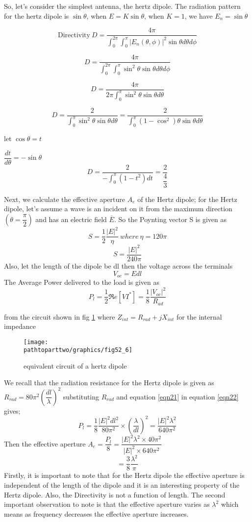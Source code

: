So, let's consider the simplest antenna, the hertz dipole. The radiation pattern for the hertz dipole is $\sin\theta$, when $E=K\sin\theta$, when $K=1$, we have $E_{n}=\sin\theta$

$$\text{Directivity} \ D=\dfrac{4\pi}{\int_{0}^{2\pi}\int_{0}^{\pi}|E_n(\theta , \phi)|^{2} \sin\theta d\theta d\phi}$$

$$ D=\dfrac{4\pi}{\int_{0}^{2\pi}\int_{0}^{\pi}\sin^{2}\theta \sin\theta d\theta d\phi}$$

$$ D=\dfrac{4\pi}{2\pi\int_{0}^{\pi}\sin^{2}\theta \sin\theta d\theta}$$

$$ D=\dfrac{2}{\int_{0}^{\pi}\sin^{2}\theta \sin\theta d\theta} = \dfrac{2}{\int_{0}^{\pi}(1-\cos^{2})\theta \sin\theta d\theta} $$

let $\cos\theta = t$

$\dfrac{dt}{d\theta}=-\sin\theta$
$$ D=\dfrac{2}{-\int_{0}^{\pi}(1-t^{2})dt} = \dfrac{2}{\dfrac{4}{3}} $$

Next, we calculate the effective aperture $A_{e}$ of the Hertz dipole; for the Hertz dipole, let's assume a wave is an incident on it from the maximum direction $(\theta=\dfrac{\pi}{2})$ and has an electric field $\bar{E}$. So the Poynting vector S is given as 
$$ S= \dfrac{1}{2}\dfrac{|E|^{{2}}}{\eta} \ where \  \eta =120\pi$$
$$ S= \dfrac{|E|^{{2}}}{240\pi}$$
Also, let the length of the dipole be dl then the voltage across the terminals
\begin{equation}
V_{oc}=Edl
\label{eqn21}
\end{equation}
The Average Power delivered to the load is given as
\begin{equation}
P_{l}=\dfrac{1}{2}\Re e [VI^{*}]=\dfrac{1}{8}\dfrac{|V_{oc}|^{2}}{R_{ad}}
\label{eqn22}
\end{equation}

from the circuit shown in fig \ref{fig6} where $Z_{int}=R_{rad}+jX_{int} $ for the internal impedance 
\begin{figure}[h]
\centering
\texttt{[image: \\pathtoparttwo/graphics/fig52\_6]}
\caption{equivalent circuit of a hertz dipole}
\label{fig6}	
\end{figure}

We recall that the radiation resistance for the Hertz dipole is given as $R_{rad}=80\pi^{2}(\dfrac{dl}{\lambda})^{2}$ substituting $R_{rad}$ and equation \ref{eqn21} in equation \ref{eqn22} gives; 
$$	P_{l}=\dfrac{1}{8}\dfrac{|E|^{2}dl^{2}}{80\pi^{2}}\times\left(\dfrac{\lambda}{dl}\right)^{2}= \dfrac{|E|^{2}\lambda^{2}}{640\pi^{2}}$$
Then the effective aperture $A_{e}=\dfrac{P_{l}}{8}=\dfrac{|E|^{2}\lambda^{2}\times40\pi^{2}}{|E|^{2}\times640\pi^{2}}$
$$=\dfrac{3}{8}\dfrac{\lambda^{2}}{\pi}$$
Firstly, it is important to note that for the Hertz dipole the effective aperture is independent of the length of the dipole and it is an interesting property of the Hertz dipole. Also, the Directivity is not a function of length. The second important observation to note is that the effective aperture varies as $\lambda^{2}$ which means as frequency decreases the effective aperture increases.

